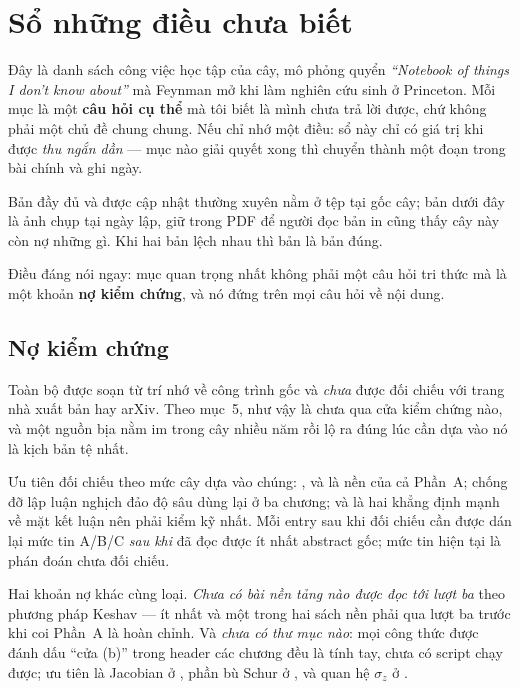 \documentclass[vslam.tex]{subfiles}
\begin{document}
\chapter*{Sổ những điều chưa biết}

\begin{tomtat}
Đây là danh sách công việc học tập của cây, mô phỏng quyển \emph{``Notebook of things I don't know about''} mà Feynman mở khi làm nghiên cứu sinh ở Princeton. Mỗi mục là một \textbf{câu hỏi cụ thể} mà tôi biết là mình chưa trả lời được, chứ không phải một chủ đề chung chung. Nếu chỉ nhớ một điều: sổ này chỉ có giá trị khi được \emph{thu ngắn dần} --- mục nào giải quyết xong thì chuyển thành một đoạn trong bài chính và ghi ngày.
\end{tomtat}

Bản đầy đủ và được cập nhật thường xuyên nằm ở tệp  tại gốc cây; bản dưới đây là ảnh chụp tại ngày lập, giữ trong PDF để người đọc bản in cũng thấy cây này còn nợ những gì. Khi hai bản lệch nhau thì bản  là bản đúng.

Điều đáng nói ngay: mục quan trọng nhất không phải một câu hỏi tri thức mà là một khoản \textbf{nợ kiểm chứng}, và nó đứng trên mọi câu hỏi về nội dung.

\section*{Nợ kiểm chứng}

Toàn bộ  được soạn từ trí nhớ về công trình gốc và \emph{chưa} được đối chiếu với trang nhà xuất bản hay arXiv. Theo  mục~5, như vậy là chưa qua cửa kiểm chứng nào, và một nguồn bịa nằm im trong cây nhiều năm rồi lộ ra đúng lúc cần dựa vào nó là kịch bản tệ nhất.

Ưu tiên đối chiếu theo mức cây dựa vào chúng: ,  và  là nền của cả Phần~A;  chống đỡ lập luận nghịch đảo độ sâu dùng lại ở ba chương;  và  là hai khẳng định mạnh về mặt kết luận nên phải kiểm kỹ nhất. Mỗi entry sau khi đối chiếu cần được dán lại mức tin A/B/C \emph{sau khi} đã đọc được ít nhất abstract gốc; mức tin hiện tại là phán đoán chưa đối chiếu.

Hai khoản nợ khác cùng loại. \emph{Chưa có bài nền tảng nào được đọc tới lượt ba} theo phương pháp Keshav --- ít nhất  và một trong hai sách nền phải qua lượt ba trước khi coi Phần~A là hoàn chỉnh. Và \emph{chưa có thư mục  nào}: mọi công thức được đánh dấu ``cửa (b)'' trong header các chương đều là tính tay, chưa có script chạy được; ưu tiên là Jacobian ở , phần bù Schur ở , và quan hệ \(\sigma_z\) ở .
\end{document}
